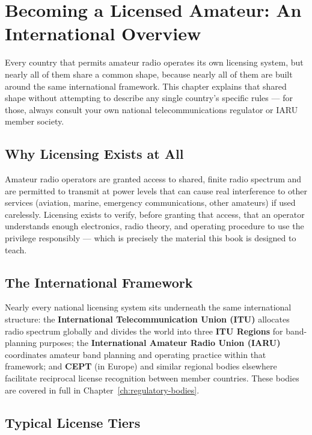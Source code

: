 \chapter{Becoming a Licensed Amateur: An International Overview}
\label{ch:becoming-a-ham}

Every country that permits amateur radio operates its own licensing
system, but nearly all of them share a common shape, because nearly all
of them are built around the same international framework. This chapter
explains that shared shape without attempting to describe any single
country's specific rules --- for those, always consult your own national
telecommunications regulator or IARU member society.

\section{Why Licensing Exists at All}

Amateur radio operators are granted access to shared, finite radio
spectrum and are permitted to transmit at power levels that can cause
real interference to other services (aviation, marine, emergency
communications, other amateurs) if used carelessly. Licensing exists to
verify, before granting that access, that an operator understands enough
electronics, radio theory, and operating procedure to use the privilege
responsibly --- which is precisely the material this book is designed to
teach.

\section{The International Framework}

\begin{keyidea}
Nearly every national licensing system sits underneath the same
international structure: the \textbf{International Telecommunication
Union (ITU)} allocates radio spectrum globally and divides the world
into three \textbf{ITU Regions} for band-planning purposes; the
\textbf{International Amateur Radio Union (IARU)} coordinates amateur
band planning and operating practice within that framework; and
\textbf{CEPT} (in Europe) and similar regional bodies elsewhere
facilitate reciprocal license recognition between member countries.
These bodies are covered in full in Chapter~\ref{ch:regulatory-bodies}.
\end{keyidea}

\section{Typical License Tiers}

